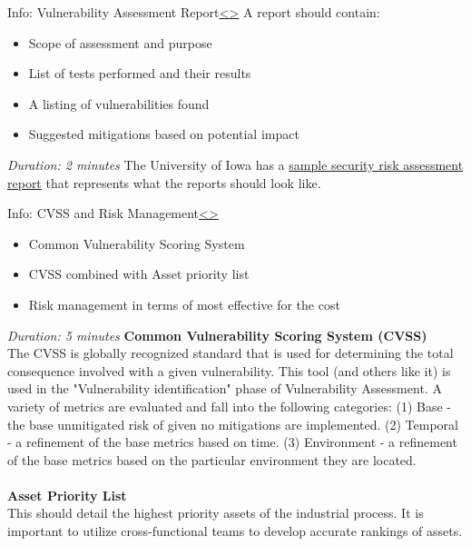 \documentclass[12pt]{extarticle}
\newenvironment{instructionblock}{\Large\bgroup}{\egroup}
\newcommand{\bi}{\begin{itemize}}
\newcommand{\ei}{\end{itemize}}
\newcounter{next}
\newcounter{prev}
\begin{document}
\pagebreak
{}
\begin{slide}{Info: Vulnerability Assessment Report}{\hyperref[slide \theprev]{\textless}\hyperref[slide \thenext]{\textgreater}}
	\begin{instructionblock}
		A report should contain:
		\bi
			\item Scope of assessment and purpose
			\item List of tests performed and their results
			\item A listing of vulnerabilities found
			\item Suggested mitigations based on potential impact
		\ei
	\end{instructionblock}
\end{slide}
\textit{Duration: 2 minutes}
\vfill
\noindent
The University of Iowa has a \href{https://itsecurity.uiowa.edu/sites/itsecurity.uiowa.edu/files/sampleriskassessmentreport.pdf}{sample security risk assessment report} that represents what the reports should look like.
\pagebreak


\pagebreak
{}
\begin{slide}{Info: CVSS and Risk Management}{\hyperref[slide \theprev]{\textless}\hyperref[slide \thenext]{\textgreater}}
	\begin{instructionblock}
	\bi
		\item Common Vulnerability Scoring System
		\item CVSS combined with Asset priority list
		\item Risk management in terms of most effective for the cost
	\ei
	\end{instructionblock}
\end{slide}
\textit{Duration: 5 minutes}
\vfill
\noindent
\textbf{Common Vulnerability Scoring System (CVSS)}\\
The CVSS is globally recognized standard that is used for determining the total consequence involved with a given vulnerability. This tool (and others like it) is used in the "Vulnerability identification" phase of Vulnerability Assessment. A variety of metrics are evaluated and fall into the following categories: (1) Base - the base unmitigated risk of given no mitigations are implemented. (2) Temporal - a refinement of the base metrics based on time. (3) Environment - a refinement of the base metrics based on the particular environment they are located. \cite{KnappLangill}\\\\
\textbf{Asset Priority List}\\
This should detail the highest priority assets of the industrial process. It is important to utilize cross-functional teams to develop accurate rankings of assets.
\pagebreak
\end{document}
